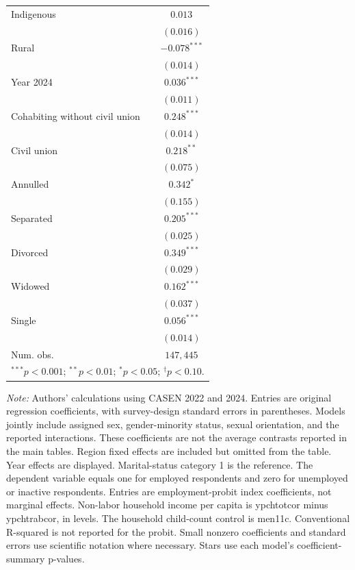 \begin{table}[htpb]
\begin{tabular}{l c}
Indigenous & $0.013$ \\
 & $(0.016)$ \\
Rural & $-0.078^{***}$ \\
 & $(0.014)$ \\
Year 2024 & $0.036^{***}$ \\
 & $(0.011)$ \\
Cohabiting without civil union & $0.248^{***}$ \\
 & $(0.014)$ \\
Civil union & $0.218^{**}$ \\
 & $(0.075)$ \\
Annulled & $0.342^{*}$ \\
 & $(0.155)$ \\
Separated & $0.205^{***}$ \\
 & $(0.025)$ \\
Divorced & $0.349^{***}$ \\
 & $(0.029)$ \\
Widowed & $0.162^{***}$ \\
 & $(0.037)$ \\
Single & $0.056^{***}$ \\
 & $(0.014)$ \\
\hline
Num. obs. & $147,445$ \\
\hline
\multicolumn{2}{l}{\scriptsize $^{***}p<0.001$; $^{**}p<0.01$; $^{*}p<0.05$; $^{\dagger}p<0.10$.} \\
\end{tabular}%
\par\smallskip
\begin{minipage}{\textwidth}\footnotesize\raggedright
\textit{Note:} Authors' calculations using CASEN 2022 and 2024. Entries are original regression coefficients, with survey-design standard errors in parentheses. Models jointly include assigned sex, gender-minority status, sexual orientation, and the reported interactions. These coefficients are not the average contrasts reported in the main tables. Region fixed effects are included but omitted from the table. Year effects are displayed. Marital-status category 1 is the reference. The dependent variable equals one for employed respondents and zero for unemployed or inactive respondents. Entries are employment-probit index coefficients, not marginal effects. Non-labor household income per capita is ypchtotcor minus ypchtrabcor, in levels. The household child-count control is men11c. Conventional R-squared is not reported for the probit. Small nonzero coefficients and standard errors use scientific notation where necessary. Stars use each model's coefficient-summary p-values.
\end{minipage}
\end{table}
